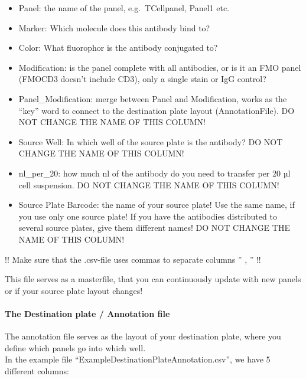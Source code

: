 \documentclass[
]{article}
\providecommand{\tightlist}{%
  \setlength{\itemsep}{0pt}\setlength{\parskip}{0pt}}
\begin{document}
\begin{itemize}
\tightlist
\item
  Panel: the name of the panel, e.g.~TCellpanel, Panel1 etc.\\
\item
  Marker: Which molecule does this antibody bind to?\\
\item
  Color: What fluorophor is the antibody conjugated to?\\
\item
  Modification: is the panel complete with all antibodies, or is it an
  FMO panel (FMOCD3 doesn't include CD3), only a single stain or IgG
  control?\\
\item
  Panel\_Modification: merge between Panel and Modification, works as
  the ``key'' word to connect to the destination plate layout
  (AnnotationFile). DO NOT CHANGE THE NAME OF THIS COLUMN!\\
\item
  Source Well: In which well of the source plate is the antibody? DO NOT
  CHANGE THE NAME OF THIS COLUMN!\\
\item
  nl\_per\_20: how much nl of the antibody do you need to transfer per
  20 µl cell suspension. DO NOT CHANGE THE NAME OF THIS COLUMN!\\
\item
  Source Plate Barcode: the name of your source plate! Use the same
  name, if you use only one source plate! If you have the antibodies
  distributed to several source plates, give them different names! DO
  NOT CHANGE THE NAME OF THIS COLUMN!
\end{itemize}

!! Make sure that the .csv-file uses commas to separate columns '' , ''
!!

This file serves as a masterfile, that you can continuously update with
new panels or if your source plate layout changes!

\hypertarget{the-destination-plate-annotation-file}{%
\paragraph{The Destination plate / Annotation
file}\label{the-destination-plate-annotation-file}}

The annotation file serves as the layout of your destination plate,
where you define which panels go into which well.\\
In the example file ``ExampleDestinationPlateAnnotation.csv'', we have 5
different columns:
\end{document}
